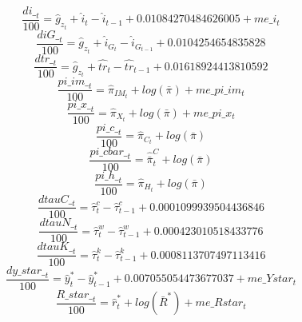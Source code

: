 \begin{dmath}
\frac{{di\__{t}}}{100}={\hat{g}_z_{t}}+{\hat{i}_{t}}-{\hat{i}_{t-1}}+0.01084270484626005+{me\_i_{t}}
\end{dmath}
\begin{dmath}
\frac{{diG\__{t}}}{100}={\hat{g}_z_{t}}+{\hat{i}_G_{t}}-{\hat{i}_G_{t-1}}+0.0104254654835828
\end{dmath}
\begin{dmath}
\frac{{dtr\__{t}}}{100}={\hat{g}_z_{t}}+{\hat{tr}_{t}}-{\hat{tr}_{t-1}}+0.01618924413810592
\end{dmath}
\begin{dmath}
\frac{{pi\_im\__{t}}}{100}={\hat{\pi}_{IM}_{t}}+log\left({\bar{\pi}}\right)+{me\_pi\_im_{t}}
\end{dmath}
\begin{dmath}
\frac{{pi\_x\__{t}}}{100}={\hat{\pi}_{X}_{t}}+log\left({\bar{\pi}}\right)+{me\_pi\_x_{t}}
\end{dmath}
\begin{dmath}
\frac{{pi\_c\__{t}}}{100}={\hat{\pi}_{C}_{t}}+log\left({\bar{\pi}}\right)
\end{dmath}
\begin{dmath}
\frac{{pi\_cbar\__{t}}}{100}={\hat{\bar{\pi}}^C_{t}}+log\left({\bar{\pi}}\right)
\end{dmath}
\begin{dmath}
\frac{{pi\_h\__{t}}}{100}={\hat{\pi}_{H}_{t}}+log\left({\bar{\pi}}\right)
\end{dmath}
\begin{dmath}
\frac{{dtauC\__{t}}}{100}={\hat{\tau}^c_{t}}-{\hat{\tau}^c_{t-1}}+0.0001099939504436846
\end{dmath}
\begin{dmath}
\frac{{dtauN\__{t}}}{100}={\hat{\tau}^w_{t}}-{\hat{\tau}^w_{t-1}}+0.000423010518433776
\end{dmath}
\begin{dmath}
\frac{{dtauK\__{t}}}{100}={\hat{\tau}^k_{t}}-{\hat{\tau}^k_{t-1}}+0.0008113707497113416
\end{dmath}
\begin{dmath}
\frac{{dy\_star\__{t}}}{100}={\hat{y}^*_{t}}-{\hat{y}^*_{t-1}}+0.007055054473677037+{me\_Ystar_{t}}
\end{dmath}
\begin{dmath}
\frac{{R\_star\__{t}}}{100}={\hat{r}^*_{t}}+log\left({\bar{R}^*}\right)+{me\_Rstar_{t}}
\end{dmath}
